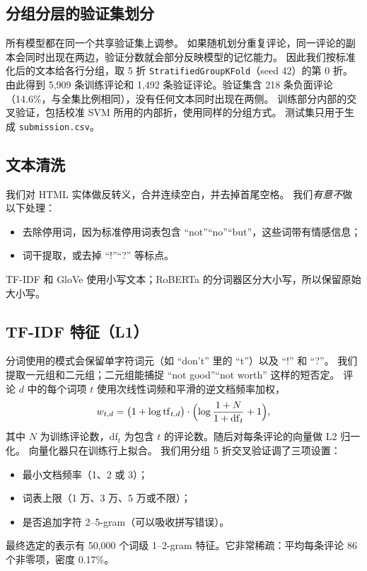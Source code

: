 \documentclass[11pt,a4paper]{article}
\begin{document}
\subsection{分组分层的验证集划分}
所有模型都在同一个共享验证集上调参。
如果随机划分重复评论，同一评论的副本会同时出现在两边，验证分数就会部分反映模型的记忆能力。
因此我们按标准化后的文本给各行分组，取 5 折 \texttt{StratifiedGroupKFold}（seed 42）的第 0 折。
由此得到 5{,}909 条训练评论和 1{,}492 条验证评论。验证集含 218 条负面评论（14.6\%，与全集比例相同），没有任何文本同时出现在两侧。
训练部分内部的交叉验证，包括校准 SVM 所用的内部折，使用同样的分组方式。
测试集只用于生成 \texttt{submission.csv}。

\subsection{文本清洗}
我们对 HTML 实体做反转义，合并连续空白，并去掉首尾空格。
我们\emph{有意不}做以下处理：
\begin{itemize}
  \item 去除停用词，因为标准停用词表包含 ``not''``no''``but''，这些词带有情感信息；
  \item 词干提取，或去掉 ``!''``?'' 等标点。
\end{itemize}
TF-IDF 和 GloVe 使用小写文本；RoBERTa 的分词器区分大小写，所以保留原始大小写。

\subsection{TF-IDF 特征（L1）}
分词使用的模式会保留单字符词元（如 ``don't'' 里的 ``t''）以及 ``!'' 和 ``?''。
我们提取一元组和二元组；二元组能捕捉 ``not good''``not worth'' 这样的短否定。
评论 $d$ 中的每个词项 $t$ 使用次线性词频和平滑的逆文档频率加权，
\begin{equation}
  w_{t,d} = \bigl(1 + \log \mathrm{tf}_{t,d}\bigr)\cdot\Bigl(\log\frac{1+N}{1+\mathrm{df}_t} + 1\Bigr),
\end{equation}
其中 $N$ 为训练评论数，$\mathrm{df}_t$ 为包含 $t$ 的评论数。随后对每条评论的向量做 L2 归一化。
向量化器只在训练行上拟合。
我们用分组 5 折交叉验证调了三项设置：
\begin{itemize}
  \item 最小文档频率（1、2 或 3）；
  \item 词表上限（1 万、3 万、5 万或不限）；
  \item 是否追加字符 2--5-gram（可以吸收拼写错误）。
\end{itemize}
最终选定的表示有 50{,}000 个词级 1--2-gram 特征。它非常稀疏：平均每条评论 86 个非零项，密度 0.17\%。
\end{document}

